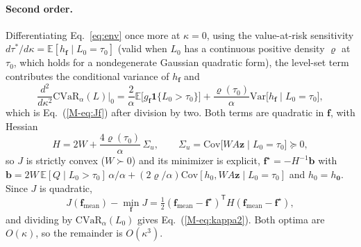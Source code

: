 \documentclass[aps,pra,onecolumn,notitlepage,superscriptaddress,nofootinbib,floatfix]{revtex4-2}
\newcommand{\cvar}{\mathrm{CVaR}}
\newcommand{\E}{\mathbb{E}}
\begin{document}
\paragraph*{Second order.} Differentiating Eq.~\eqref{eq:env} once more at
$\kappa=0$, using the value-at-risk sensitivity
$d\tau^\ast/d\kappa=\E[h_{\mathbf f}\mid L_0=\tau_0]$ (valid when $L_0$ has a
continuous positive density $\varrho$ at $\tau_0$, which holds for a
nondegenerate Gaussian quadratic form), the level-set term contributes the
conditional variance of $h_{\mathbf f}$ and
\begin{equation}
\frac{d^2}{d\kappa^2}\cvar_\alpha(L)\Big|_{0}
=\frac2\alpha\E\big[g_{\mathbf f}\mathbf 1\{L_0>\tau_0\}\big]
+\frac{\varrho(\tau_0)}{\alpha}\mathrm{Var}\big[h_{\mathbf f}\mid L_0=\tau_0\big],
\end{equation}
which is Eq.~(\ref{M-eq:Jf}) after division by two. Both terms are quadratic
in $\mathbf f$, with Hessian
\begin{equation}
H=2W+\frac{4\varrho(\tau_0)}{\alpha}\,\Sigma_u,\qquad
\Sigma_u=\mathrm{Cov}\big[WA\mathbf z\mid L_0=\tau_0\big]\succeq0,
\label{eq:Hess}
\end{equation}
so $J$ is strictly convex ($W\succ0$) and its minimizer is explicit,
$\mathbf f^\star=-H^{-1}\mathbf b$ with
$\mathbf b=2W\,\E[Q\mid L_0>\tau_0]\,\alpha/\alpha+(2\varrho/\alpha)\mathrm{Cov}[h_0,WA\mathbf z\mid L_0=\tau_0]$
and $h_0=h_{\mathbf 0}$. Since $J$ is quadratic,
\begin{equation}
J(\mathbf f_{\mathrm{mean}})-\min_{\mathbf f}J
=\tfrac12(\mathbf f_{\mathrm{mean}}-\mathbf f^\star)^{\mathsf T}H(\mathbf f_{\mathrm{mean}}-\mathbf f^\star),
\end{equation}
and dividing by $\cvar_\alpha(L_0)$ gives Eq.~(\ref{M-eq:kappa2}). Both optima
are $O(\kappa)$, so the remainder is $O(\kappa^3)$.
\end{document}
